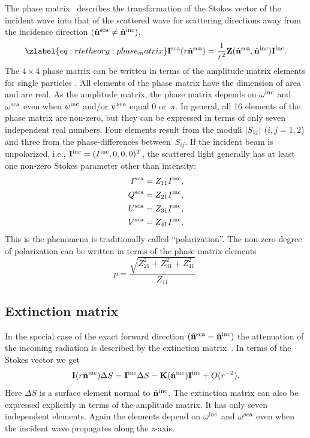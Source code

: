 The phase matrix \PhaMat\ describes the transformation of the Stokes
vector of the incident wave into that of the scattered wave for
scattering directions away from the incidence direction
$(\hat{{\bf n}}^{\mathrm{sca}}\neq\hat{{\bf n}}^{\mathrm{inc}})$,
\begin{equation}
  \zlabel{eq:rtetheory:phase_matrix}
  \StoVec^{\sca}(r \hat{\PDir}^{\sca}) =
    \frac{1}{r^2}\PhaMat(\hat{\PDir}^{\sca},\hat{\PDir}^{\inc}) \StoVec^{\inc}.
\end{equation}
The $4\times4$ phase matrix can be written in terms of the amplitude
matrix elements for single particles \citep{Mishchenko:02}. All
elements of the phase matrix have the dimension of area and are real.
As the amplitude matrix, the phase matrix depends on $\omega^{\mathrm{inc}}$
and $\omega^{\mathrm{sca}}$ even when $\psi^{\mathrm{inc}}$ and/or $\psi^{\mathrm{sca}}$ equal
0 or~$\pi$.  In general, all 16 elements of the phase matrix are
non-zero, but they can be expressed in terms of only seven independent
real numbers. Four elements result from the moduli $\left| S_{ij} \right| $ ($i,j =
1,2$) and three from the phase-differences between~$S_{ij}$.  If the
incident beam is unpolarized, i.e., ${\bf I}^{\mathrm{inc}} = (I^{\mathrm{inc}},
0, 0, 0)^T$, the scattered light generally has at least one
non-zero Stokes parameter other than intensity:
\begin{eqnarray}
  I^{\mathrm{sca}} &= Z_{11}I^{\mathrm{inc}},\\
  Q^{\mathrm{sca}} &= Z_{21}I^{\mathrm{inc}},\\
  U^{\mathrm{sca}} &= Z_{31}I^{\mathrm{inc}},\\
  V^{\mathrm{sca}} &= Z_{41}I^{\mathrm{inc}}.
\end{eqnarray}
This is the phenomena is traditionally called ``polarization''. The
non-zero degree of polarization 
can be written in terms of the phase matrix elements
\begin{equation}
  p = \frac{\sqrt{Z_{21}^2+Z_{31}^2+Z_{41}^2}}{Z_{11}}.
\end{equation}


\subsection{Extinction matrix}
In the special case of the exact forward direction
$(\hat{{\bf n}}^{\mathrm{sca}}=\hat{{\bf n}}^{\mathrm{inc}})$ the attenuation of the
incoming radiation is described by the extinction matrix~\ExtMat. In
terms of the Stokes vector we get
\begin{equation}
  {\bf I}(r \hat{{\bf n}}^{\mathrm{inc}}) \Delta S =
    {\bf I}^{\mathrm{inc}} \Delta S - {\bf K}(\hat{{\bf n}}^{\mathrm{inc}}) {\bf I}^{\mathrm{inc}} + O(r^{-2}).
\end{equation}
Here $\Delta S$ is a surface element normal to
$\hat{{\bf n}}^{\mathrm{inc}}$.  The extinction matrix can also be expressed
explicitly in terms of the amplitude matrix. It has only seven
independent elements. Again the elements depend on $\omega^{\mathrm{inc}}$ and
$\omega^{\mathrm{sca}}$ even when the incident wave propagates along the
$z$-axis.

